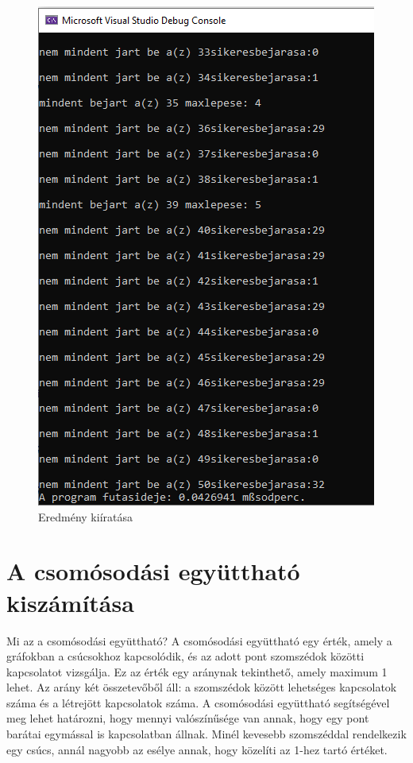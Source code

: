 \begin{figure}[h]
	\centering
	\includegraphics[scale=0.4]{images/utaseredmeny}
	\caption{Eredmény kiíratása}
\end{figure}

\section{A csomósodási együttható kiszámítása}

Mi az a csomósodási együttható? A csomósodási együttható egy érték, amely a gráfokban a csúcsokhoz kapcsolódik, és az adott pont szomszédok közötti kapcsolatot vizsgálja. Ez az érték egy aránynak tekinthető, amely maximum 1 lehet. Az arány két összetevőből áll: a szomszédok között lehetséges kapcsolatok száma és a létrejött kapcsolatok száma. A csomósodási együttható segítségével meg lehet határozni, hogy mennyi valószínűsége van annak, hogy egy pont barátai egymással is kapcsolatban állnak. Minél kevesebb szomszéddal rendelkezik egy csúcs, annál nagyobb az esélye annak, hogy közelíti az 1-hez tartó értéket.

